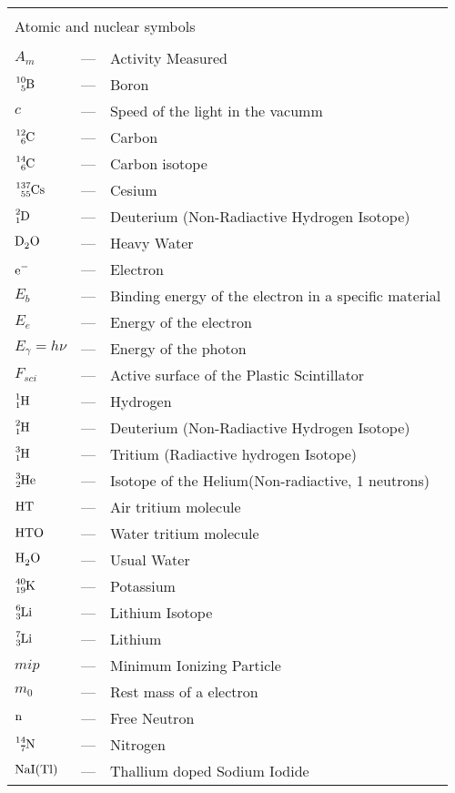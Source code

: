 \begin{longtable}{p{25mm} c p{120mm} }
\\
\\
\multicolumn{3}{l}{Atomic and nuclear symbols}\\
\\
$A_{m}$ & --- & Activity Measured\\
$\ce{^{10}_{5}B}$ & --- & Boron\\
$c$ & --- & Speed of the light in the vacumm\\
$\ce{^{12}_{6}C}$ & --- & Carbon\\
$\ce{^{14}_{6}C}$ & --- & Carbon isotope\\
$\ce{^{137}_{55}Cs}$ & --- & Cesium\\
$\ce{^{2}_{1}D}$ & --- & Deuterium (Non-Radiactive Hydrogen Isotope)\\
$\ce{D_{2}O}$ & --- & Heavy Water\\
$\ce{e^-}$ & --- & Electron\\
$E_b$ & --- & Binding energy of the electron in a specific material\\
$E_e$ & --- & Energy of the electron\\
$E_\gamma = h\nu$ & --- & Energy of the photon\\
$F_{sci}$ & --- & Active surface of the Plastic Scintillator\\
$\ce{^{1}_{1}H}$ & --- & Hydrogen\\
$\ce{^{2}_{1}H}$ & --- & Deuterium (Non-Radiactive Hydrogen Isotope)\\
$\ce{^{3}_{1}H}$ & --- & Tritium (Radiactive hydrogen Isotope)\\
$\ce{^{3}_{2}He}$ & --- & Isotope of the Helium(Non-radiactive, 1 neutrons)\\
$\ce{HT}$ & --- & Air tritium molecule\\
$\ce{HTO}$ & --- & Water tritium molecule\\
$\ce{H_{2}O}$ & --- & Usual Water\\
$\ce{^{40}_{19}K}$ & --- & Potassium\\
$\ce{^{6}_{3}Li}$ & --- & Lithium Isotope\\
$\ce{^{7}_{3}Li}$ & --- & Lithium\\
$mip$ & --- & Minimum Ionizing Particle\\
$m_0$ & --- & Rest mass of a electron\\
$\ce{n}$ & --- & Free Neutron\\
$\ce{^{14}_{7}N}$ & --- & Nitrogen\\
$\ce{NaI(Tl)}$ & --- & Thallium doped Sodium Iodide\\

\end{longtable}
